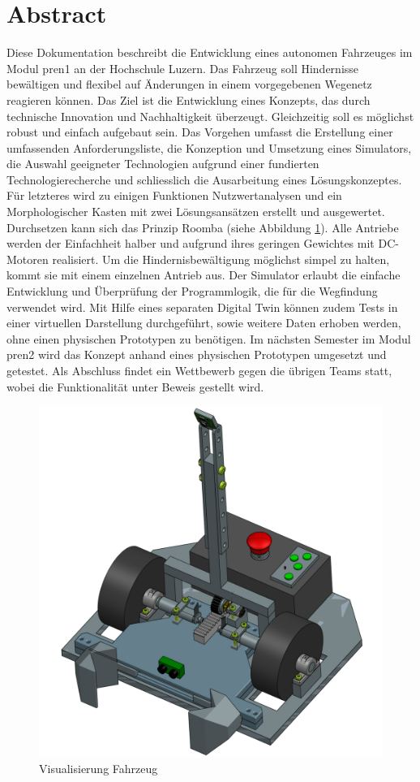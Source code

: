 \newpage
\section{Abstract}

Diese Dokumentation beschreibt die Entwicklung eines autonomen Fahrzeuges im Modul \acrfull{pren1} an der Hochschule Luzern. Das Fahrzeug soll Hindernisse bewältigen und flexibel auf Änderungen in einem vorgegebenen Wegenetz reagieren können. Das Ziel ist die Entwicklung eines Konzepts, das durch technische Innovation und Nachhaltigkeit überzeugt. Gleichzeitig soll es möglichst robust und einfach aufgebaut sein.
Das Vorgehen umfasst die Erstellung einer umfassenden Anforderungsliste, die Konzeption und Umsetzung eines Simulators, die Auswahl geeigneter Technologien aufgrund einer fundierten Technologierecherche und schliesslich die Ausarbeitung eines Lösungskonzeptes. Für letzteres wird zu einigen Funktionen Nutzwertanalysen und ein Morphologischer Kasten mit zwei Lösungsansätzen erstellt und ausgewertet. Durchsetzen kann sich das Prinzip Roomba (siehe Abbildung \ref{img:Visualisierung Fahrzeug}). Alle Antriebe werden der Einfachheit halber und aufgrund ihres geringen Gewichtes mit DC-Motoren realisiert. Um die Hindernisbewältigung möglichst simpel zu halten, kommt sie mit einem einzelnen Antrieb aus. Der Simulator erlaubt die einfache Entwicklung und Überprüfung der Programmlogik, die für die Wegfindung verwendet wird. Mit Hilfe eines separaten Digital Twin können zudem Tests in einer virtuellen Darstellung durchgeführt, sowie weitere Daten erhoben werden, ohne einen physischen Prototypen zu benötigen. 
Im nächsten Semester im Modul \acrshort{pren2} wird das Konzept anhand eines physischen Prototypen umgesetzt und getestet. Als Abschluss findet ein Wettbewerb gegen die übrigen Teams statt, wobei die Funktionalität unter Beweis gestellt wird.

\begin{figure}[H] %
    \centering
        \includegraphics[width=0.5\linewidth]       {Skizze_Fahrzeug.png}               \caption[Visualisierung Fahrzeug]
        {Visualisierung Fahrzeug}
        
        \label{img:Visualisierung Fahrzeug}
    \end{figure} 